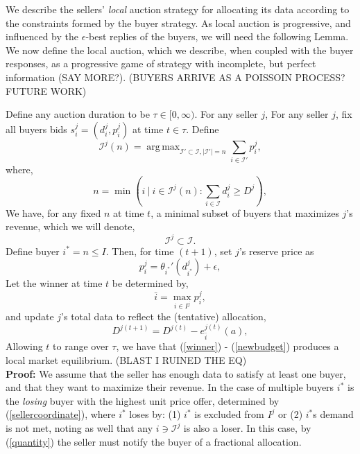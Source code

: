\documentclass[12pt]{article}
\theoremstyle{definition}
\newcommand{\mcI}{\mathcal{I}}
\DeclareMathOperator*{\argmax}{arg\,max}
\begin{document}
\begin{multicols}{2}
We describe the sellers' \emph{local} auction strategy for allocating its
data according to the constraints formed by the buyer strategy. As
local auction is progressive, and influenced by the $\epsilon$-best replies of
the buyers, we will need the following Lemma. 
We now define the local auction, which we describe, when coupled with the buyer
responses, as a progressive game of strategy with incomplete, but perfect
information (SAY MORE?).
(BUYERS ARRIVE AS A POISSOIN PROCESS? FUTURE WORK)

{
\label{sellerstrategy}
Define any auction duration to be $\tau \in [0,\infty)$. For any seller $j$,
For any seller $j$, fix all buyers bids $s_i^j=(d_i^j,p_i^j)$ at time $t\in\tau$.
Define
$$
    \mcI^j(n) =\argmax_{{\mcI}' \subset \mcI, \vert{\mcI}'\vert =
n}\sum_{i\in{\mcI}'} p_i^j,
$$
where,
\begin{equation}\label{sellercoordinate}
    n = \min( i \ \vert \ i \in\mcI^j(n) : \displaystyle\sum_{i\in\mcI} d_i^j \ge
D^j),
\end{equation} 
We have, for any fixed $n$ at time $t$, a minimal subset 
of buyers that maximizes $j$'s revenue, which we will
denote,
\begin{equation}\label{buyers}
    \mcI^j \subset \mcI.
\end{equation} 
Define buyer $i^* = n \le I$.
Then, for time $(t+1)$, set $j$'s reserve price as 
\begin{equation}\label{newprice}
    p_i^j = \theta_{i^*}'(d_{i^*}^j) + \epsilon,
\end{equation}
Let the winner at time $t$ be determined by,
\begin{equation}\label{winner}
    \bar{i} = \displaystyle\max_{i\in I^j} p_i^j,
\end{equation}
and update $j$'s total data to reflect the (tentative) allocation,
\begin{equation}\label{newbudget}
    D^{j(t+1)} = D^{j(t)} - e_{\bar{i}}^{j(t)}(a),
\end{equation}
Allowing $t$ to range over $\tau$, we have that (\ref{winner}) - (\ref{newbudget}) produces a local
market equilibrium. (BLAST I RUINED THE EQ) %
}\\
\textbf{Proof:}
We assume that the seller has enough data to satisfy at least one buyer,
and that they want to maximize their revenue.
In the case of multiple buyers $i^*$ is the \emph{losing} buyer with the highest unit
price offer, determined by (\ref{sellercoordinate}), where $i^*$ loses by: (1)
$i^*$ is excluded from $I^j$ or (2) $i^*$s demand is not met, noting as well
that any $i\ni \mcI^j$ is also a loser. 
In this case, by (\ref{quantity}) the seller must notify the buyer of a
fractional allocation.


\end{multicols}
\end{document}
